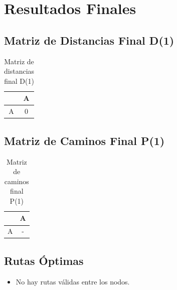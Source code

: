 \documentclass[12pt]{article}
\begin{document}
\clearpage
\section{Resultados Finales}
\subsection{Matriz de Distancias Final D(1)}
\begin{table}[h!]
\centering
\begin{tabular}{|c|c|}
\hline
 & A \\\hline
A & 0 \\\hline
\end{tabular}
\caption{Matriz de distancias final D(1)}
\end{table}

\clearpage
\subsection{Matriz de Caminos Final P(1)}
\begin{table}[h!]
\centering
\begin{tabular}{|c|c|}
\hline
 & A \\\hline
A & - \\\hline
\end{tabular}
\caption{Matriz de caminos final P(1)}
\end{table}

\clearpage
\subsection{Rutas Óptimas}
\begin{itemize}
\item No hay rutas válidas entre los nodos.
\end{itemize}
\end{document}
